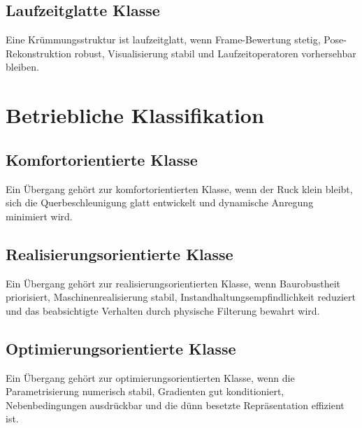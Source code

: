 \subsection{Laufzeitglatte Klasse}
\begin{definition}
\label{def:runtime-smooth-class}
Eine Krümmungsstruktur ist laufzeitglatt, wenn Frame-Bewertung stetig,
Pose-Rekonstruktion robust, Visualisierung stabil und Laufzeitoperatoren
vorhersehbar bleiben.
\end{definition}

\section{Betriebliche Klassifikation}

\subsection{Komfortorientierte Klasse}
\begin{definition}
\label{def:comfort-oriented-class}
Ein Übergang gehört zur komfortorientierten Klasse, wenn der Ruck klein
bleibt, sich die Querbeschleunigung glatt entwickelt und dynamische Anregung
minimiert wird.
\end{definition}

\subsection{Realisierungsorientierte Klasse}
\begin{definition}
\label{def:realization-oriented-class}
Ein Übergang gehört zur realisierungsorientierten Klasse, wenn
Baurobustheit priorisiert, Maschinenrealisierung stabil,
Instandhaltungsempfindlichkeit reduziert und das beabsichtigte Verhalten durch
physische Filterung bewahrt wird.
\end{definition}

\subsection{Optimierungsorientierte Klasse}
\begin{definition}
\label{def:optimization-oriented-class}
Ein Übergang gehört zur optimierungsorientierten Klasse, wenn die
Parametrisierung numerisch stabil, Gradienten gut konditioniert,
Nebenbedingungen ausdrückbar und die dünn besetzte Repräsentation effizient
ist.
\end{definition}

